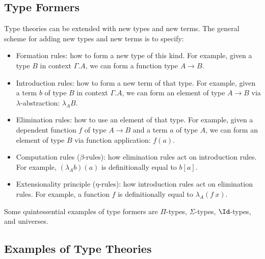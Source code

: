 \documentclass{amsart}
\begin{document}
\subsection{Type Formers}
\label{sec:type-formers}

Type theories can be extended with new types and new terms.
The general scheme for adding new types and new terms is to specify:
\begin{itemize}
\item Formation rules: how to form a new type of this kind.
  For example, given a type $B$ in context $\Gamma.A$, we can form a function type $A \to B$.
\item Introduction rules: how to form a new term of that type.
  For example, given a term $b$ of type $B$ in context $\Gamma.A$, we can form an element of type $A \to B$ via $\lambda$-abstraction: $\lambda_{A}B$.
\item Elimination rules: how to use an element of that type.
  For example, given a dependent function $f$ of type $A \to B$ and a term $a$ of type $A$, we can form an element of type $B$ via function application: $f(a)$.
\item Computation rules ($\beta$-rules): how elimination rules act on introduction rules.
  For example, $(\lambda_{A}b)(a)$ is definitionally equal to $b[a]$.
\item Extensionality principle ($\eta$-rules): how introduction rules act on elimination rules.
  For example, a function $f$ is definitionally equal to $\lambda_{A}(f~x)$.
\end{itemize}

Some quintessential examples of type formers are $\Pi$-types, $\Sigma$-types, $\Id$-types, and universes.

\subsection{Examples of Type Theories}
\label{sec:examples-of-type-theories}
\end{document}
